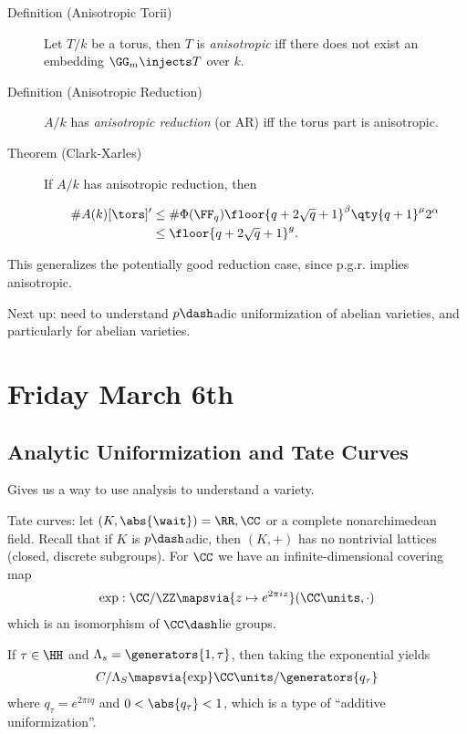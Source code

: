 \begin{description}
\item[Definition (Anisotropic Torii)]
Let \(T/k\) be a torus, then \(T\) is \emph{anisotropic} iff there does
not exist an embedding \(\GG_m \injects T\) over \(k\).
\item[Definition (Anisotropic Reduction)]
\(A/k\) has \emph{anisotropic reduction} (or AR) iff the torus part is
anisotropic.
\item[Theorem (Clark-Xarles)]
If \(A/k\) has anisotropic reduction, then

\begin{align*}
\#A(k)[\tors]' 
&\leq \# \Phi(\FF_q) \floor{ q + 2\sqrt q + 1  }^\beta \qty{q + 1}^\mu 2^{\alpha} \\
&\leq \floor{ q + 2\sqrt q + 1 }^g
.\end{align*}
\end{description}

This generalizes the potentially good reduction case, since p.g.r.
implies anisotropic.

Next up: need to understand \(p\dash\)adic uniformization of abelian
varieties, and particularly for abelian varieties.

\hypertarget{friday-march-6th}{%
\section{Friday March 6th}\label{friday-march-6th}}

\hypertarget{analytic-uniformization-and-tate-curves}{%
\subsection{Analytic Uniformization and Tate
Curves}\label{analytic-uniformization-and-tate-curves}}

Gives us a way to use analysis to understand a variety.

Tate curves: let \((K, \abs{\wait}) = \RR, \CC\) or a complete
nonarchimedean field. Recall that if \(K\) is \(p\dash\)adic, then
\((K, +)\) has no nontrivial lattices (closed, discrete subgroups). For
\(\CC\) we have an infinite-dimensional covering map
\begin{align*}
\operatorname{exp}: \CC/\ZZ \mapsvia{z\mapsto e^{2\pi i z}} (\CC\units, \cdot)
\end{align*} which is an isomorphism of \(\CC\dash\)lie groups.

If \(\tau \in \HH\) and \(\Lambda_s = \generators{1, \tau}\), then
taking the exponential yields \begin{align*}
C/\Lambda_S \mapsvia{\operatorname{exp}} \CC\units/\generators{q_\tau}
\end{align*} where \(q_\tau = e^{2\pi i q}\) and
\(0 < \abs{q_\tau} < 1\), which is a type of ``additive
uniformization''.


